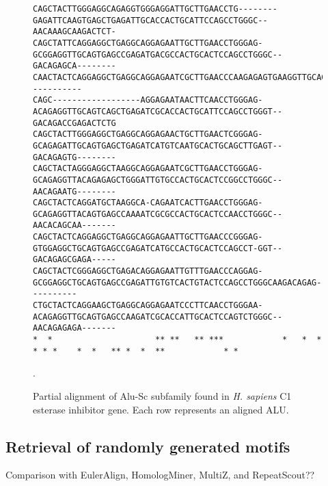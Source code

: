 \documentclass[twoside,11pt]{article}
\begin{document}
\begin{figure}[t]
\scriptsize
\begin{verbatim}
CAGCTACTTGGGAGGCAGAGGTGGGAGGATTGCTTGAACCTG--------GAGATTCAAGTGAGCTGAGATTGCACCACTGCATTCCAGCCTGGGC--AACAAAGCAAGACTCT-
CAGCTATTCAGGAGGCTGAGGCAGGAGAATTGCTTGAACCTGGGAG-GCGGAGGTTGCAGTGAGCCGAGATGACGCCACTGCACTCCAGCCTGGGC--GACAGAGCA--------
CAACTACTCAGGAGGCTGAGGCAGGAGAATCGCTTGAACCCAAGAGAGTGAAGGTTGCAGTGAGCTGAGATCATGCCACTTCACTCCAGCCTGAGTGAAACAGC-----------
CAGC------------------AGGAGAATAACTTCAACCTGGGAG-ACAGAGGTTGCAGTCAGCTGAGATCGCACCACTGCATTCCAGCCTGGGT--GACAGACCGAGACTCTG
CAGCTACTTGGGAGGCTGAGGCAGGAGAACTGCTTGAACTCGGGAG-GCAGAGATTGCAGTGAGCTGAGATCATGTCAATGCACTGCAGCTTGAGT--GACAGAGTG--------
CAGCTACTAGGGAGGCTAAGGCAGGAGAATCGCTTGAACCTGGGAG-GCAGAGGTTACAGAGAGCTGGGATTGTGCCACTGCACTCCGGCCTGGGC--AACAGAATG--------
CAGCTACTCAGGATGCTAAGGCA-CAGAATCACTTGAACCTGGGAG-GCAGAGGTTACAGTGAGCCAAAATCGCGCCACTGCACTCCAACCTGGGC--AACACAGCAA-------
CAGCTACTCAGGAGGCTGAGGCAGGAGAATTGCTTGAACCCGGGAG-GTGGAGGCTGCAGTGAGCCGAGATCATGCCACTGCACTCCAGCCT-GGT--GACAGAGCGAGA-----
CAGCTACTCGGGAGGCTGAGACAGGAGAATTGTTTGAACCCAGGAG-GCGGAGGCTGCAGTGAGCCGAGATTGTGTCACTGTACTCCAGCCTGGGCAAGACAGAG----------
CTGCTACTCAGGAAGCTGAGGCAGGAGAATCCCTTCAACCTGGGAA-ACAGAGGTTGCAGTGAGCCAAGATCGCACCATTGCACTCCAGTCTGGGC--AACAGAGAGA-------
*  *                     ** **   ** ***            *   *  * * * *    *  *   ** *  *  **            * * 
\end{verbatim}
\vspace{-0.5cm}
\normalsize
\caption{Partial alignment of Alu-Sc subfamily found in \emph{H. sapiens} C1 esterase inhibitor gene. Each row represents an aligned ALU.}.
\label{fig-align}
\end{figure}

\subsection{Retrieval of randomly generated motifs}
Comparison with EulerAlign, HomologMiner, MultiZ, and RepeatScout??
\end{document}

